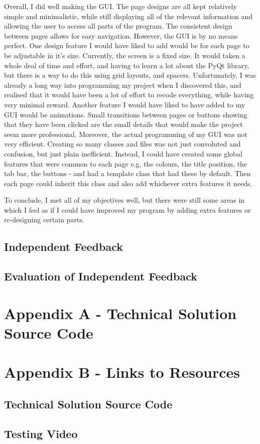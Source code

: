 \documentclass{article}
\begin{document}
Overall, I did well making the GUI. The page designs are all kept relatively simple and minimalistic, while still displaying all of the relevant information and allowing the user to access all parts of the program. The consistent design between pages allows for easy navigation. However, the GUI is by no means perfect. One design feature I would have liked to add would be for each page to be adjustable in it's size. Currently, the screen is a fixed size. It would taken a whole deal of time and effort, and having to learn a lot about the PyQt library, but there is a way to do this using grid layouts, and spacers. Unfortunately, I was already a long way into programming my project when I discovered this, and realised that it would have been a lot of effort to recode everything, while having very minimal reward. Another feature I would have liked to have added to my GUI would be animations. Small transitions between pages or buttons showing that they have been clicked are the small details that would make the project seem more professional. Moreover, the actual programming of my GUI was not very efficient. Creating so many classes and files was not just convoluted and confusion, but just plain inefficient. Instead, I could have created some global features that were common to each page e.g, the colours, the title position, the tab bar, the buttons - and had a template class that had these by default. Then each page could inherit this class and also add whichever extra features it needs.

To conclude, I met all of my objectives well, but there were still some areas in which I feel as if I could have improved my program by adding extra features or re-designing certain parts.

\subsection{Independent Feedback}
\subsection{Evaluation of Independent Feedback}


\clearpage

\section{Appendix A - Technical Solution Source Code}
\clearpage
\section{Appendix B - Links to Resources}
\subsection{Technical Solution Source Code}
\subsection{Testing Video}
\clearpage
\nocite{*}
\printbibliography
{}
\end{document}
